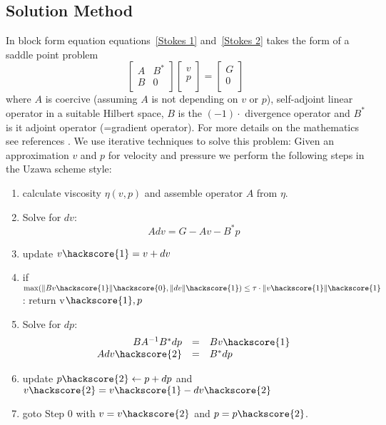 \subsection{Solution Method \label{STOKES SOLVE}}
In block form equation equations~\ref{Stokes 1} and~\ref{Stokes 2} takes the form of a saddle point problem
\begin{equation}
\left[ \begin{array}{cc}
A     & B^{*} \\
B & 0 \\
\end{array} \right]
\left[ \begin{array}{c}
v \\
p \\
\end{array} \right]
=\left[ \begin{array}{c}
G \\
0 \\
\end{array} \right]
\label{SADDLEPOINT}
\end{equation}
where $A$ is coercive (assuming $A$ is not depending on $v$ or $p$), self-adjoint linear operator in a suitable Hilbert space, $B$ is the $(-1) \cdot$ divergence operator and $B^{*}$ is it adjoint operator (=gradient operator).
For more details on the mathematics see references \cite{AAMIRBERKYAN2008,MBENZI2005}. 
We use iterative techniques to solve this problem: Given an approximation $v$ and $p$ for 
velocity and pressure we perform the following steps in the Uzawa scheme  style:
\begin{enumerate}
 \item calculate viscosity $\eta(v,p)$ and assemble operator $A$ from $\eta$.
 \item Solve for $dv$:
 \begin{equation}
 A dv = G - A v - B^{*} p  \label{SADDLEPOINT ITER STEP 1}
\end{equation}
 \item update $v\hackscore{1}= v+ dv$
 \item if $\max(\|Bv\hackscore{1}\|\hackscore{0},\|dv\|\hackscore{1}) \le \tau \cdot \|v\hackscore{1}\|\hackscore{1}$: return v$\hackscore{1},p$ 
 \item Solve for $dp$:
 \begin{equation}
 \begin{array}{rcl}
 B A^{-1} B^{*} dp & = & Bv\hackscore{1} \\
 A dv\hackscore{2} & = & B^{*} dp 
\end{array}
 \label{SADDLEPOINT ITER STEP 2}
 \end{equation}
 \item update $p\hackscore{2}\leftarrow p+ dp$ and $v\hackscore{2}= v\hackscore{1} - dv\hackscore{2}$
 \item goto Step 0 with $v=v\hackscore{2}$ and $p=p\hackscore{2}$.
\end{enumerate}
